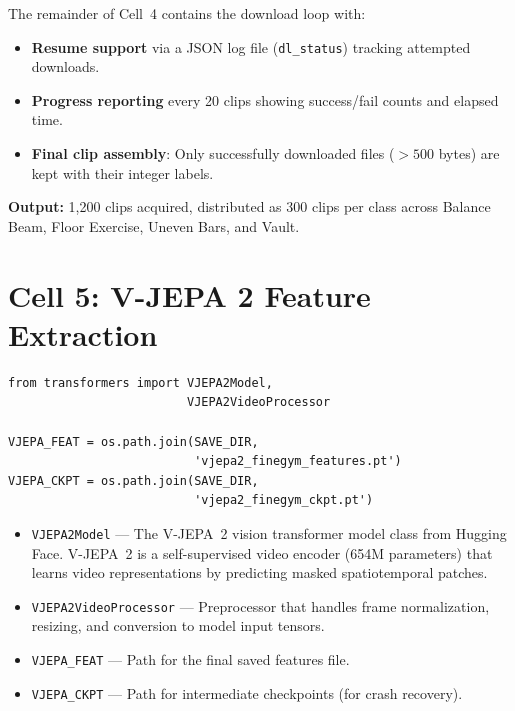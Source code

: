 The remainder of Cell~4 contains the download loop with:
\begin{itemize}[nosep]
  \item \textbf{Resume support} via a JSON log file (\texttt{dl\_status}) tracking attempted downloads.
  \item \textbf{Progress reporting} every 20 clips showing success/fail counts and elapsed time.
  \item \textbf{Final clip assembly}: Only successfully downloaded files ($>500$ bytes) are kept with their integer labels.
\end{itemize}

\textbf{Output:} 1,200 clips acquired, distributed as 300 clips per class across Balance Beam, Floor Exercise, Uneven Bars, and Vault.

\newpage
\section{Cell 5: V-JEPA 2 Feature Extraction}

\begin{lstlisting}
from transformers import VJEPA2Model,
                         VJEPA2VideoProcessor

VJEPA_FEAT = os.path.join(SAVE_DIR,
                          'vjepa2_finegym_features.pt')
VJEPA_CKPT = os.path.join(SAVE_DIR,
                          'vjepa2_finegym_ckpt.pt')
\end{lstlisting}

\begin{explanation}
\begin{itemize}[nosep]
  \item \texttt{VJEPA2Model} --- The V-JEPA~2 vision transformer model class from Hugging Face. V-JEPA~2 is a self-supervised video encoder (654M parameters) that learns video representations by predicting masked spatiotemporal patches.
  \item \texttt{VJEPA2VideoProcessor} --- Preprocessor that handles frame normalization, resizing, and conversion to model input tensors.
  \item \texttt{VJEPA\_FEAT} --- Path for the final saved features file.
  \item \texttt{VJEPA\_CKPT} --- Path for intermediate checkpoints (for crash recovery).
\end{itemize}
\end{explanation}


